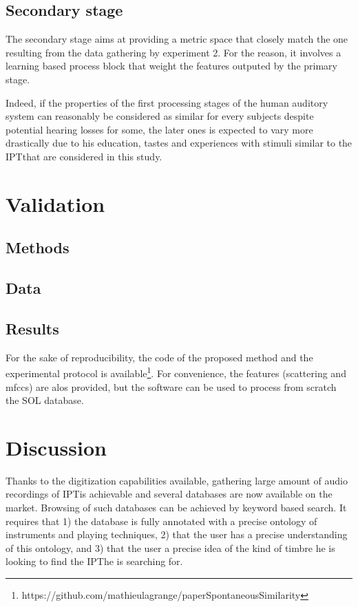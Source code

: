 \documentclass{article}
\newcommand{\ipt}{IPT}
\begin{document}
\subsection{Secondary stage}

The secondary stage aims at providing a metric space that closely match the one resulting from the data gathering by experiment 2. For the reason, it involves a learning based process block that weight the features outputed by the primary stage.

Indeed, if the properties of the first processing stages of the human auditory system can reasonably be considered as similar for every subjects despite potential hearing losses for some, the later ones is expected to vary more drastically due to his education, tastes and experiences with stimuli similar to the \ipt that are considered in this study.



\section{Validation}\label{sec:validation}

\subsection{Methods}

\subsection{Data}

\subsection{Results}

For the sake of reproducibility, the code of the proposed method and the experimental protocol is available\footnote{https://github.com/mathieulagrange/paperSpontaneousSimilarity}. For convenience, the features (scattering and mfccs) are alos provided, but the software can be used to process from scratch the SOL database.

\section{Discussion}\label{sec:discussion}

Thanks to the digitization capabilities available, gathering large amount of audio recordings of \ipt is achievable and several databases are now available on the market. Browsing of such databases can be achieved by keyword based search. It requires that 1) the database is fully annotated with a precise ontology of instruments and playing techniques, 2) that the user has a precise understanding of this ontology, and 3) that the user a precise idea of the kind of timbre he is looking to find the \ipt he is searching for.
\end{document}
